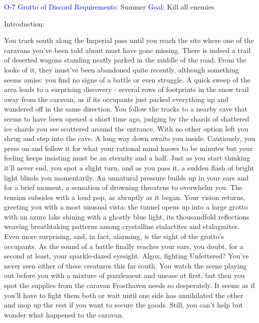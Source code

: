 \documentclass[fontsize=11pt]{scrartcl}
\begin{document}
  \BgThispage
	\vspace*{-0.25cm} \hskip 1.85cm {\myfont\textcolor{Blue}{O-7 \LARGE{Grotto of Discord}}}\vspace*{0.4cm}\newline\newline
	{\myfont\LARGE{\textcolor{Blue}{Requirements:}} \normalsize{Summer}}\newline
	{\myfont\LARGE{\textcolor{Blue}{Goal:}} \normalsize{Kill all enemies}}\newline\newline
	\begin{multicols}{3}
	  \begin{center}
		  {\myfont\LARGE{\textcolor{OliveGreen}{Introduction:}}}
		\end{center}
    \footnotesize{You track south along the Imperial pass until you reach the site where one of the caravans you’ve been told about must have gone missing. There is indeed a trail of deserted wagons standing neatly parked in the middle of the road. From the looks of it, they must’ve been abandoned quite recently, although something seems amiss: you find no signs of a battle or even struggle. A quick sweep of the area leads to a surprising discovery - several rows of footprints in the snow trail away from the caravan, as if its occupants just packed everything up and wandered off in the same direction. You follow the tracks to a nearby cave that seems to have been opened a short time ago, judging by the shards of shattered ice shards you see scattered around the entrance.\newline\newline
With no other option left you shrug and step into the cave. A long way down awaits you inside. Cautiously, you press on and follow it for what your rational mind knows to be minutes but your feeling keeps insisting must be an eternity and a half. Just as you start thinking it’ll never end, you spot a slight turn, and as you pass it, a sudden flash of bright light blinds you momentarily. An unnatural pressure builds up in your ears and for a brief moment, a sensation of drowning threatens to overwhelm you. The tension subsides with a loud pop, as abruptly as it began.\newline\newline
Your vision returns, greeting you with a most unusual vista: the tunnel opens up into a large grotto with an azure lake shining with a ghostly blue light, its thousandfold reflections weaving breathtaking patterns among crystalline stalactites and stalagmites. Even more surprising, and, in fact, alarming, is the sight of the grotto’s occupants. As the sound of a battle finally reaches your ears, you doubt, for a second at least, your sparkle-dazed eyesight. Algox, fighting Unfettered? You’ve never seen either of these creatures this far south. You watch the scene playing out before you with a mixture of puzzlement and unease at first, but then you spot the supplies from the caravan Frosthaven needs so desperately. It seems as if you’ll have to fight them both or wait until one side has annihilated the other and mop up the rest if you want to secure the goods. Still, you can’t help but wonder what happened to the caravan.}

\end{multicols}
\end{document}
